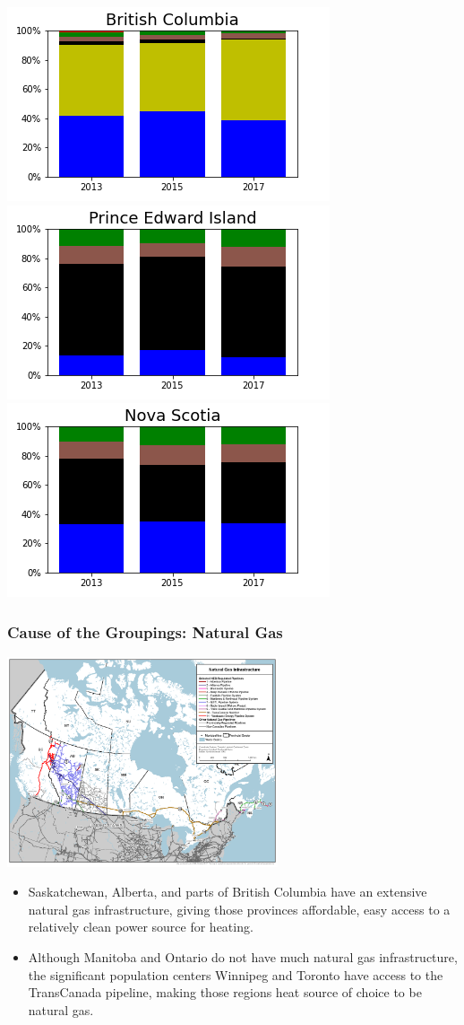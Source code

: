 \documentclass{beamer}
\begin{document}
\begin{frame}
\includegraphics[width=0.25\linewidth]{bc.png}%
\includegraphics[width=0.25\linewidth]{pe.png}%
\includegraphics[width=0.25\linewidth]{ns.png}


\end{frame}


\begin{frame}

\frametitle{Cause of the Groupings: Natural Gas}
\includegraphics[width=0.6\textwidth]{natural_gas_pipeline_natural_resources_canada}
\small
\begin{itemize}
	\item Saskatchewan, Alberta, and parts of British Columbia have an extensive natural gas infrastructure, giving those provinces affordable, easy access to a relatively clean power source for heating.
	\item Although Manitoba and Ontario do not have much natural gas infrastructure, the significant population centers Winnipeg and Toronto have access to the TransCanada pipeline, making those regions heat source of choice to be natural gas.
\end{itemize}
\normalsize
\end{frame}
\end{document}

